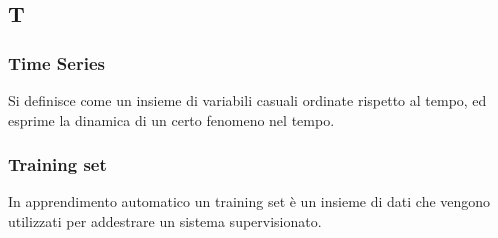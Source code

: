 \subsection*{\textbf{\hfill \Huge{T} \hfill}} 
\subsubsection*{Time Series}
Si definisce come un insieme di variabili casuali ordinate rispetto al tempo, ed esprime la dinamica di un certo fenomeno nel tempo.

\subsubsection*{Training set}
In apprendimento automatico un training set è un insieme di dati che vengono utilizzati per addestrare un sistema supervisionato.